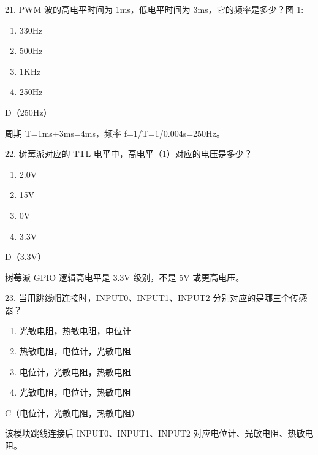 \begin{question}{21. PWM 波的高电平时间为 1ms，低电平时间为 3ms，它的频率是多少？图 1:}
\begin{enumerate}[label=\Alph*., leftmargin=2.4em, itemsep=0.2em]
\item 330Hz
\item 500Hz
\item 1KHz
\item 250Hz
\end{enumerate}
\end{question}
\begin{answer}
D（250Hz）
\end{answer}
\begin{explanation}
周期 T=1ms+3ms=4ms，频率 f=1/T=1/0.004s=250Hz。
\end{explanation}

\begin{question}{22. 树莓派对应的 TTL 电平中，高电平（1）对应的电压是多少？}
\begin{enumerate}[label=\Alph*., leftmargin=2.4em, itemsep=0.2em]
\item 2.0V
\item 15V
\item 0V
\item 3.3V
\end{enumerate}
\end{question}
\begin{answer}
D（3.3V）
\end{answer}
\begin{explanation}
树莓派 GPIO 逻辑高电平是 3.3V 级别，不是 5V 或更高电压。
\end{explanation}

\begin{question}{23. 当用跳线帽连接时，INPUT0、INPUT1、INPUT2 分别对应的是哪三个传感器？}
\begin{enumerate}[label=\Alph*., leftmargin=2.4em, itemsep=0.2em]
\item 光敏电阻，热敏电阻，电位计
\item 热敏电阻，电位计，光敏电阻
\item 电位计，光敏电阻，热敏电阻
\item 光敏电阻，电位计，热敏电阻
\end{enumerate}
\end{question}
\begin{answer}
C（电位计，光敏电阻，热敏电阻）
\end{answer}
\begin{explanation}
该模块跳线连接后 INPUT0、INPUT1、INPUT2 对应电位计、光敏电阻、热敏电阻。
\end{explanation}


